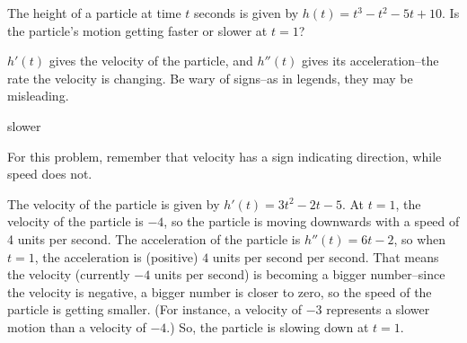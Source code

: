 \begin{Mquestion}
The height of a particle at time $t$ seconds is given by $h(t)=t^3-t^2-5t+10$. Is the particle's motion getting faster or slower at $t=1$?
\end{Mquestion}
\begin{hint}
$h'(t)$ gives the velocity of the particle, and $h''(t)$ gives its acceleration--the rate the velocity is changing. Be wary of signs--as in legends, they may be misleading.
\end{hint}
\begin{answer}
slower
\end{answer}
\begin{solution}
For this problem, remember that velocity has a sign indicating direction, while speed does not.

The velocity of the particle is given by $h'(t)=3t^2-2t-5$. At $t=1$, the velocity of the particle is $-4$, so the particle is moving downwards with a speed of 4 units per second. The acceleration of the particle is $h''(t)=6t-2$, so when $t=1$, the acceleration is (positive) $4$ units per second per second. That means the velocity (currently $-4$ units per second) is becoming a bigger number--since the velocity is negative, a bigger number is closer to zero, so the speed of the particle is getting smaller. (For instance, a velocity of $-3$ represents a slower motion than a velocity of $-4$.) So, the particle is  slowing down at $t=1$.
\end{solution}




